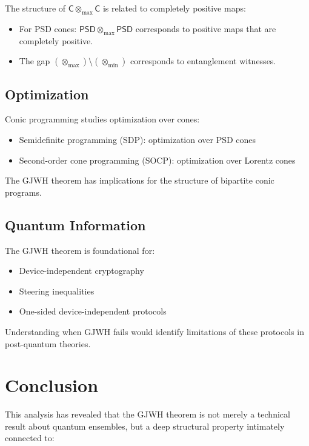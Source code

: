 \documentclass[11pt,a4paper]{article}
\theoremstyle{definition}
\newcommand{\C}{\mathsf{C}}
\newcommand{\tmin}{\otimes_{\min}}
\newcommand{\tmax}{\otimes_{\max}}
\newcommand{\PSD}{\mathsf{PSD}}
\begin{document}
The structure of $\C \tmax \C$ is related to completely positive maps:

\begin{itemize}
    \item For PSD cones: $\PSD \tmax \PSD$ corresponds to positive maps that are completely positive.
    \item The gap $(\tmax) \setminus (\tmin)$ corresponds to entanglement witnesses.
\end{itemize}

\subsection{Optimization}

Conic programming \cite{ben2001lectures} studies optimization over cones:
\begin{itemize}
    \item Semidefinite programming (SDP): optimization over PSD cones
    \item Second-order cone programming (SOCP): optimization over Lorentz cones
\end{itemize}

The GJWH theorem has implications for the structure of bipartite conic programs.

\subsection{Quantum Information}

The GJWH theorem is foundational for:
\begin{itemize}
    \item Device-independent cryptography
    \item Steering inequalities
    \item One-sided device-independent protocols
\end{itemize}

Understanding when GJWH fails would identify limitations of these protocols in post-quantum theories.

\section{Conclusion}

This analysis has revealed that the GJWH theorem is not merely a technical result about quantum ensembles, but a deep structural property intimately connected to:
\end{document}
